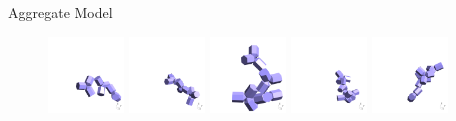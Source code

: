 \documentclass[12pt]{beamer}
\begin{document}
\begin{frame}{Aggregate Model}
\begin{figure}
    \hfill
    \includegraphics[width = 0.18\textwidth]{Figures/aggregates/aggregate1221.png}
    \includegraphics[width = 0.18\textwidth]{Figures/aggregates/aggregate1261.png}
    \includegraphics[width = 0.18\textwidth]{Figures/aggregates/aggregate1340.png}
    \includegraphics[width = 0.18\textwidth]{Figures/aggregates/aggregate1422.png}
    \includegraphics[width = 0.18\textwidth]{Figures/aggregates/aggregate1461.png}
\end{figure}
\end{frame}
\end{document}
